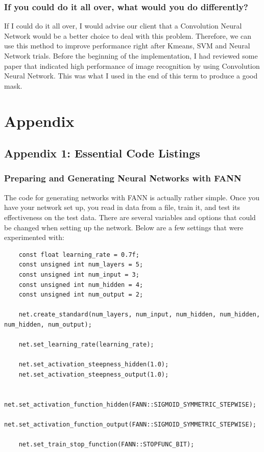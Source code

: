\documentclass[10pt,journal,compsoc, draftclsnofoot,onecolumn]{IEEEtran}
\begin{document}
\subsubsection{If you could do it all over, what would you do differently?}
If I could do it all over, I would advise our client that a Convolution Neural Network would be a better choice to deal with this problem. Therefore, we can use this method to improve performance right after Kmeans, SVM and Neural Network trials. Before the beginning of the implementation, I had reviewed some paper that indicated high performance of image recognition by using Convolution Neural Network. This was what I used in the end of this term to produce a good mask.

\newpage
\section{Appendix}
\subsection{Appendix 1: Essential Code Listings}

\subsubsection{Preparing and Generating Neural Networks with FANN}
The code for generating networks with FANN is actually rather simple. Once you have your network set up, you read in data from a file, train it, and test its effectiveness on the test data. There are several variables and options that could be changed when setting up the network. Below are a few settings that were experimented with:

\begin{verbatim}
	const float learning_rate = 0.7f;
	const unsigned int num_layers = 5;
	const unsigned int num_input = 3;
	const unsigned int num_hidden = 4;
	const unsigned int num_output = 2;

	net.create_standard(num_layers, num_input, num_hidden, num_hidden, num_hidden, num_output);

	net.set_learning_rate(learning_rate);

	net.set_activation_steepness_hidden(1.0);
	net.set_activation_steepness_output(1.0);

	net.set_activation_function_hidden(FANN::SIGMOID_SYMMETRIC_STEPWISE);
	net.set_activation_function_output(FANN::SIGMOID_SYMMETRIC_STEPWISE);

	net.set_train_stop_function(FANN::STOPFUNC_BIT);
\end{verbatim}
\end{document}
